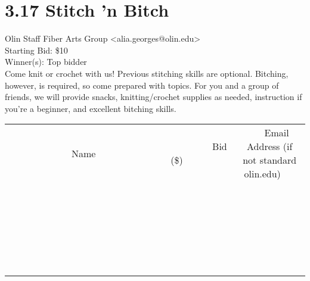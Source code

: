 \documentclass[11pt]{article}
\begin{document}
					\section*{3.17 Stitch 'n Bitch}
					Olin Staff Fiber Arts Group <alia.georges@olin.edu> \\
					Starting Bid: \$10 \\
					Winner(s): Top bidder \\
					Come knit or crochet with us! Previous stitching skills are optional. Bitching, however, is required, so come prepared with topics. For you and a group of friends, we will provide snacks, knitting/crochet supplies as needed, instruction if you're a beginner, and excellent bitching skills. \\
					[6ex]
					\begin{tabular}{c c c}
						~~~~~~~~~~~~~Name~~~~~~~~~~~~~ & ~~~~~~~~~Bid (\$)~~~~~~~~~ & ~~~Email Address (if not standard olin.edu)~~~ \\
				
 & & \\
\hline
 & & \\
\hline
 & & \\
\hline
 & & \\
\hline
 & & \\
\hline
 & & \\
\hline
 & & \\
\hline
 & & \\
\hline
 & & \\
\hline
 & & \\
\hline
 & & \\
\hline
 & & \\
\hline
 & & \\
\hline
 & & \\
\hline
 & & \\
\hline
 & & \\
\hline
 & & \\
\hline
 & & \\
\hline
 & & \\
\hline
 & & \\
\hline
 & & \\
\hline
 & & \\
\hline
 & & \\
\hline
 & & \\
\hline
 & & \\
\hline
 & & \\
\hline
					\end{tabular}
					\clearpage
				
\end{document}
